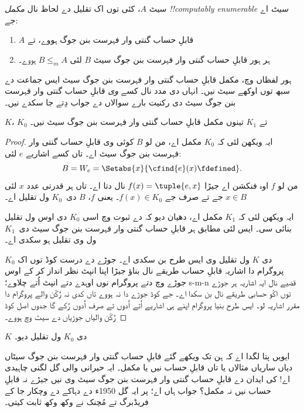 \documentclass[../../../include/open-logic-section]{subfiles}
\begin{document}

\begin{defn}
سیٹ $A$، کئی توں اک تقلیل دے لحاظ
نال \emph{مکمل !!{computably enumerable} سیٹ}
اے جے:
\begin{enumerate}
\item $A$ قابلِ حساب گنتی وار فہرست
بنن جوگ ہووے، تے
\item ہر ہور قابلِ حساب گنتی وار
فہرست بنن جوگ سیٹ $B$ لئی
$B \leq_m A$ ہووے۔
\end{enumerate}
\end{defn}

ہور لفظاں وچ، مکمل قابلِ حساب گنتی وار
فہرست بنن جوگ سیٹ ایس جماعت دے
سبھ توں اوکھے سیٹ نیں۔ انہاں دی مدد نال
کسے \emph{وی} قابلِ حساب گنتی وار فہرست
بنن جوگ سیٹ دی رکنیت بارے سوالاں دے
جواب دِتے جا سکدے نیں۔

\begin{thm}
$K$، $K_0$ تے $K_1$ تینوں مکمل
قابلِ حساب گنتی وار فہرست بنن جوگ
سیٹ نیں۔
\end{thm}

\begin{proof}
ایہ ویکھن لئی کہ $K_0$ مکمل اے، من لو $B$
کوئی وی قابلِ حساب گنتی وار فہرست
بنن جوگ سیٹ اے۔ تاں کسے اشاریے
$e$ لئی:
\[
B = W_e = \Setabs{x}{\cfind{e}(x) \fdefined}.
\]
من لو $f$ اوہ فنکشن اے جیڑا
$f(x) = \tuple{e, x}$ نال دتا اے۔
تاں ہر قدرتی عدد $x$ لئی
$x \in B$ جے تے صرف جے
$f(x) \in K_0$۔ یعنی $f$،
$B$ دی~$K_0$ ول تقلیل اے۔

ایہ ویکھن لئی کہ $K_1$ مکمل اے، دھیان دیو
کہ  دے ثبوت وچ
اسی $K_0$ دی اوس ول تقلیل بنائی
سی۔ ایس لئی 
مطابق ہر قابلِ حساب گنتی وار
فہرست بنن جوگ سیٹ دی~$K_1$
ول وی تقلیل ہو سکدی اے۔

$K_0$ دی $K$ ول تقلیل وی ایس
طرح بن سکدی اے۔ جوڑے دے درست
کوڈ توں اک پروگرام دا اشاریہ
قابلِ حساب طریقے نال بناؤ جیڑا
اپنا انپٹ نظر انداز کر کے اوس
جوڑے وچ دتے پروگرام نوں اوہدے
دتے انپٹ اُتے چلاوے؛ s-m-n
قضیے نال ایہ اشاریہ ہر جوڑے توں
اکّو حسابی طریقے نال بن سکدا اے۔
جے کوڈ جوڑے دا نہ ہووے تاں
کدی نہ رُکّن والے پروگرام دا
مقرر اشاریہ لو۔ ایس طرح بنیا
پروگرام اپنے ہی اشاریے اُتے
اُدوں تے صرف اُدوں رُکے گا
جدوں اصل کوڈ رُکّن والیاں جوڑیاں
دے سیٹ وچ ہووے۔
\end{proof}

\begin{prob}
$K$ دی $K_0$ ول تقلیل دیو۔
\end{prob}

\begin{digress}
ایویں پتا لگدا اے کہ ہن تک
ویکھے گئے قابلِ حساب گنتی وار
فہرست بنن جوگ سیٹاں دیاں
ساریاں مثالاں یا تاں قابلِ
حساب نیں یا مکمل۔ ایہ حیرانی
والی گل لگنی چاہیدی اے! کی
ایدان دے قابلِ حساب گنتی وار
فہرست بنن جوگ سیٹ وی نیں
جیڑے نہ قابلِ حساب نیں نہ
مکمل؟ جواب ہاں اے؛ پر ایہ
گل 1950ء دے دہاکے دے
وچکار جا کے فریڈبرگ تے
مُچنک نے وکھ وکھ ثابت کیتی۔
\end{digress}
\end{document}
